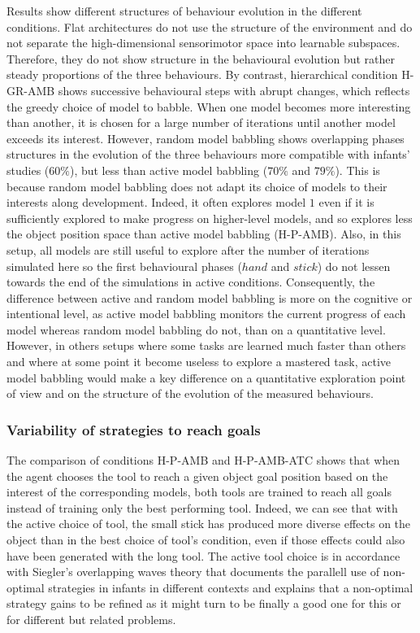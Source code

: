 \documentclass[10pt,letterpaper]{article}
\begin{document}
		Results show different structures of behaviour evolution in the different conditions.		
		Flat architectures do not use the structure of the environment and do not separate the high-dimensional sensorimotor space into learnable subspaces.
		Therefore, they do not show structure in the behavioural evolution but rather steady proportions of the three behaviours.
		By contrast, hierarchical condition H-GR-AMB shows successive behavioural steps with abrupt changes, which reflects the greedy choice of model to babble.
		When one model becomes more interesting than another, it is chosen
		for a large number of iterations until another model exceeds its interest.
		However, random model babbling shows overlapping phases structures in the evolution of the three behaviours more compatible with infants' studies ($60\%$), 
		but less than active model babbling ($70\%$ and $79\%$).
		This is because random model babbling does not adapt its choice of models to their interests along development.
		Indeed, it often explores model $1$ even if it is sufficiently explored to make progress on higher-level models, 
		and so explores less the object position space than active model babbling (H-P-AMB).
		Also, in this setup, all models are still useful to explore after the number of iterations simulated 
		here so the first behavioural phases ($hand$ and $stick$) do not lessen towards the end of the simulations in active conditions. 
		Consequently, the difference between active and random model babbling is more on the cognitive or intentional level, 
		as active model babbling monitors the current progress of each model whereas random model babbling do not, than on a quantitative level.
		However, in others setups where some tasks are learned much faster than others and where at some point it become useless to explore a mastered task, active model babbling would
		make a key difference on a quantitative exploration point of view and on the structure of the evolution of the measured behaviours.
	
	
	\subsubsection{Variability of strategies to reach goals}
	
		The comparison of conditions H-P-AMB and H-P-AMB-ATC shows that when the agent chooses the tool to reach a given object goal position based on the interest of the corresponding models,
		both tools are trained to reach all goals instead of training only the best performing tool.
		Indeed, we can see that with the active choice of tool, the small stick has produced more diverse effects on the object than in the best choice of tool's condition, even if those effects could also have been 
		generated with the long tool.
		The active tool choice is in accordance with Siegler's overlapping waves theory that documents the parallell use of non-optimal strategies in infants in different contexts
		and explains that a non-optimal strategy gains to be refined as it might turn to be finally a good one for this or for different but related problems.
		
\end{document}
